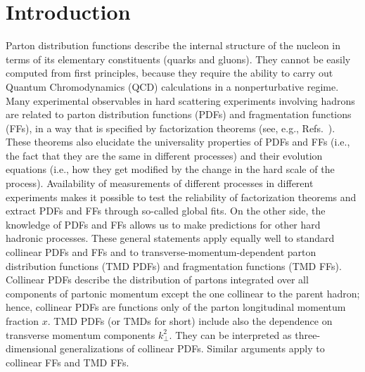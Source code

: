 \documentclass[aps,preprintnumbers,showpacs,nofootinbib,superscriptaddress,floatfix]{revtex4}
\newcommand{\T}{\perp}
\begin{document}

\maketitle

\section{Introduction}
\label{s:intro}

Parton distribution functions describe the internal structure of the nucleon
in terms of its elementary constituents (quarks and gluons). They cannot be
easily computed from first principles, because they require the ability to
carry out Quantum Chromodynamics (QCD) calculations in a nonperturbative
regime. Many experimental observables in hard scattering experiments
involving hadrons are related to parton distribution functions (PDFs) and
fragmentation functions (FFs), in a way that is specified by factorization
theorems (see, e.g., Refs.~\cite{Collins:1989gx,Collins:2011zzd}). 
These theorems also elucidate the universality properties of PDFs and FFs
(i.e., the fact that they are the same in different processes) 
and their evolution equations (i.e., how they get modified by the change in
the hard scale of the process). 
Availability of measurements of different processes in different
experiments makes it possible to test the reliability of factorization
theorems and extract PDFs and FFs through so-called global fits. 
On the other side, the knowledge of PDFs and FFs allows us
to make predictions for other hard hadronic processes. 
These general statements apply equally well to
standard collinear PDFs and FFs and to transverse-momentum-dependent parton
distribution functions (TMD PDFs) and fragmentation functions (TMD FFs). 
Collinear PDFs
describe the distribution of partons integrated over all components of
partonic momentum except the one collinear to the parent hadron; hence,
collinear PDFs
are functions only of the parton longitudinal momentum fraction $x$. 
TMD PDFs (or TMDs for short) 
include also the dependence on transverse momentum components $k_{\T}^2$. 
They can be interpreted as three-dimensional generalizations of collinear PDFs.
Similar arguments apply to collinear FFs and TMD FFs.
\end{document}
